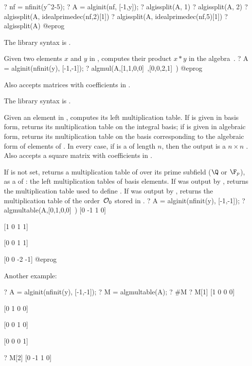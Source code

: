 \bprog
? nf = nfinit(y^2-5);
? A = alginit(nf, [-1,y]);
? algissplit(A, 1)
? algissplit(A, 2)
? algissplit(A, idealprimedec(nf,2)[1])
? algissplit(A, idealprimedec(nf,5)[1])
? algissplit(A)
@eprog

The library syntax is .

\label{se:algmul}
Given two elements $x$ and $y$ in , computes their product $x*y$
in the algebra~.
\bprog
? A = alginit(nfinit(y), [-1,-1]);
? algmul(A,[1,1,0,0]~,[0,0,2,1]~)
@eprog

Also accepts matrices with coefficients in .

The library syntax is .

\label{se:algmultable}
Given an element  in , computes its left multiplication
table. If  is given in basis form, returns its multiplication table on
the integral basis; if  is given in algebraic form, returns its
multiplication table on the basis corresponding to the algebraic form of
elements of . In every case, if  is a  of length $n$,
then the output is a $n\times n$ .
Also accepts a square matrix with coefficients in .

If  is not set, returns a multiplication table of  over its
prime subfield ($\Q$ or $\F_p$), as a  of : the left
multiplication tables of basis elements. If  was output by
, returns the multiplication table used to define .
If  was output by , returns the multiplication table of
the order~${\cal O}_0$ stored in .
\bprog
? A = alginit(nfinit(y), [-1,-1]);
? algmultable(A,[0,1,0,0]~)
[0 -1  1  0]

[1  0  1  1]

[0  0  1  1]

[0  0 -2 -1]
@eprog

Another example:

\bprog
? A = alginit(nfinit(y), [-1,-1]);
? M = algmultable(A);
? #M
? M[1]
[1 0 0 0]

[0 1 0 0]

[0 0 1 0]

[0 0 0 1]

? M[2]
[0 -1  1  0]

